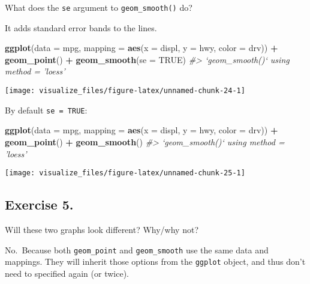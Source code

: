 \documentclass[]{book}
\newenvironment{Shaded}{\begin{snugshade}}{\end{snugshade}}
\newcommand{\CommentTok}[1]{\textcolor[rgb]{0.56,0.35,0.01}{\textit{#1}}}
\newcommand{\DataTypeTok}[1]{\textcolor[rgb]{0.13,0.29,0.53}{#1}}
\newcommand{\KeywordTok}[1]{\textcolor[rgb]{0.13,0.29,0.53}{\textbf{#1}}}
\newcommand{\NormalTok}[1]{#1}
\newcommand{\OperatorTok}[1]{\textcolor[rgb]{0.81,0.36,0.00}{\textbf{#1}}}
\newcommand{\OtherTok}[1]{\textcolor[rgb]{0.56,0.35,0.01}{#1}}
\newcommand{\StringTok}[1]{\textcolor[rgb]{0.31,0.60,0.02}{#1}}
\theoremstyle{definition}
\theoremstyle{definition}
\theoremstyle{definition}
\theoremstyle{remark}
\begin{document}
What does the \texttt{se} argument to \texttt{geom\_smooth()} do?

It adds standard error bands to the lines.

\begin{Shaded}
\begin{Highlighting}[]
\KeywordTok{ggplot}\NormalTok{(}\DataTypeTok{data =}\NormalTok{ mpg, }\DataTypeTok{mapping =} \KeywordTok{aes}\NormalTok{(}\DataTypeTok{x =}\NormalTok{ displ, }\DataTypeTok{y =}\NormalTok{ hwy, }\DataTypeTok{color =}\NormalTok{ drv)) }\OperatorTok{+}\StringTok{ }
\StringTok{  }\KeywordTok{geom_point}\NormalTok{() }\OperatorTok{+}\StringTok{ }
\StringTok{  }\KeywordTok{geom_smooth}\NormalTok{(}\DataTypeTok{se =} \OtherTok{TRUE}\NormalTok{)}
\CommentTok{#> `geom_smooth()` using method = 'loess'}
\end{Highlighting}
\end{Shaded}

\begin{center}\texttt{[image: visualize\_files/figure-latex/unnamed-chunk-24-1]} \end{center}

By default \texttt{se\ =\ TRUE}:

\begin{Shaded}
\begin{Highlighting}[]
\KeywordTok{ggplot}\NormalTok{(}\DataTypeTok{data =}\NormalTok{ mpg, }\DataTypeTok{mapping =} \KeywordTok{aes}\NormalTok{(}\DataTypeTok{x =}\NormalTok{ displ, }\DataTypeTok{y =}\NormalTok{ hwy, }\DataTypeTok{color =}\NormalTok{ drv)) }\OperatorTok{+}\StringTok{ }
\StringTok{  }\KeywordTok{geom_point}\NormalTok{() }\OperatorTok{+}\StringTok{ }
\StringTok{  }\KeywordTok{geom_smooth}\NormalTok{()}
\CommentTok{#> `geom_smooth()` using method = 'loess'}
\end{Highlighting}
\end{Shaded}

\begin{center}\texttt{[image: visualize\_files/figure-latex/unnamed-chunk-25-1]} \end{center}

\hypertarget{exercise-5.-3}{%
\subsection{Exercise 5.}\label{exercise-5.-3}}

Will these two graphs look different? Why/why not?

No.~Because both \texttt{geom\_point} and \texttt{geom\_smooth} use the
same data and mappings. They will inherit those options from the
\texttt{ggplot} object, and thus don't need to specified again (or
twice).
\end{document}

